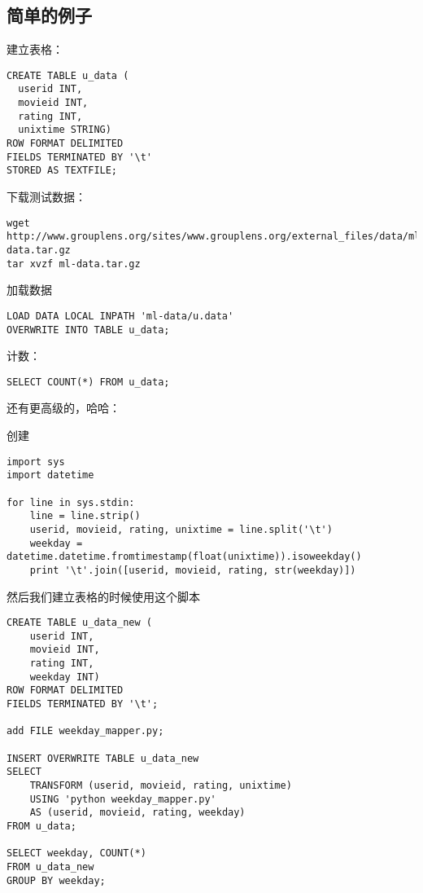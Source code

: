 \documentclass{article}
\begin{document}
\subsection{简单的例子}

建立表格：

\begin{verbatim}
CREATE TABLE u_data (
  userid INT,
  movieid INT,
  rating INT,
  unixtime STRING)
ROW FORMAT DELIMITED
FIELDS TERMINATED BY '\t'
STORED AS TEXTFILE;
\end{verbatim}

下载测试数据：

\begin{verbatim}
wget http://www.grouplens.org/sites/www.grouplens.org/external_files/data/ml-data.tar.gz
tar xvzf ml-data.tar.gz
\end{verbatim}

加载数据

\begin{verbatim}
LOAD DATA LOCAL INPATH 'ml-data/u.data'
OVERWRITE INTO TABLE u_data;
\end{verbatim}

计数：

\begin{verbatim}
SELECT COUNT(*) FROM u_data;
\end{verbatim}

还有更高级的，哈哈：

创建 
\begin{verbatim}
import sys
import datetime

for line in sys.stdin:
	line = line.strip()
	userid, movieid, rating, unixtime = line.split('\t')
	weekday = datetime.datetime.fromtimestamp(float(unixtime)).isoweekday()
	print '\t'.join([userid, movieid, rating, str(weekday)])
\end{verbatim}

然后我们建立表格的时候使用这个脚本

\begin{verbatim}
CREATE TABLE u_data_new (
	userid INT,
	movieid INT,
	rating INT,
	weekday INT)
ROW FORMAT DELIMITED
FIELDS TERMINATED BY '\t';

add FILE weekday_mapper.py;

INSERT OVERWRITE TABLE u_data_new
SELECT 
	TRANSFORM (userid, movieid, rating, unixtime)
	USING 'python weekday_mapper.py'
	AS (userid, movieid, rating, weekday)
FROM u_data;

SELECT weekday, COUNT(*)
FROM u_data_new
GROUP BY weekday;
\end{verbatim}
\end{document}
